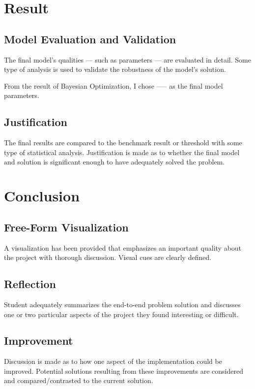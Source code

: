 \documentclass[a4paper,10pt,fleqn]{article}
\begin{document}
\section{Result}
\subsection{Model Evaluation and Validation}
The final model’s qualities — such as parameters — are evaluated in detail. Some type of analysis is used to validate the robustness of the model’s solution.

From the result of Bayesian Optimization, I chose ----- as the final model parameters.



\subsection{Justification}
The final results are compared to the benchmark result or threshold with some type of statistical analysis. Justification is made as to whether the final model and solution is significant enough to have adequately solved the problem.




\section{Conclusion}
\subsection{Free-Form Visualization}
A visualization has been provided that emphasizes an important quality about the project with thorough discussion. Visual cues are clearly defined.

\subsection{Reflection}
Student adequately summarizes the end-to-end problem solution and discusses one or two particular aspects of the project they found interesting or difficult.

\subsection{Improvement}
Discussion is made as to how one aspect of the implementation could be improved. Potential solutions resulting from these improvements are considered and compared/contrasted to the current solution.
\end{document}
